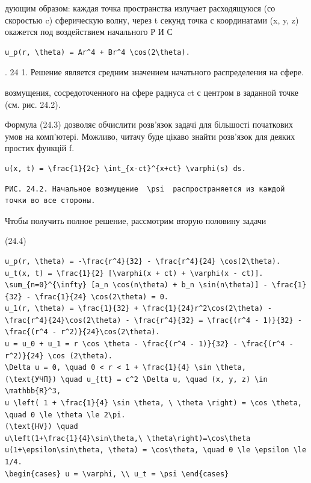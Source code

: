 \documentclass[
  ukrainian,
]{article}
\begin{document}
дующим образом: каждая точка пространства излучает расходящуюся (со
скоростью c) сферическую волну, через t секунд точка с координатами (x,
y, z) окажется под воздействием начального Р И С

\begin{verbatim}
u_p(r, \theta) = Ar^4 + Br^4 \cos(2\theta).
\end{verbatim}

. 24 1. Решение является средним значением начатьного распределения на
сфере.

возмущения, сосредоточенного на сфере раднуса ct с центром в заданной
точке (см. рис. 24.2).

Формула (24.3) дозволяє обчислити розв'язок задачі для більшості
початкових умов на комп'ютері. Можливо, читачу буде цікаво знайти
розв'язок для деяких простих функцій f.

\begin{verbatim}
u(x, t) = \frac{1}{2c} \int_{x-ct}^{x+ct} \varphi(s) ds.
\end{verbatim}

\begin{verbatim}
РИС. 24.2. Начальное возмущение  \psi  распространяется из каждой точки во все стороны.
\end{verbatim}

Чтобы получить полное решение, рассмотрим вторую половину задачи

(24.4)

\begin{verbatim}
u_p(r, \theta) = -\frac{r^4}{32} - \frac{r^4}{24} \cos(2\theta).
u_t(x, t) = \frac{1}{2} [\varphi(x + ct) + \varphi(x - ct)].
\sum_{n=0}^{\infty} [a_n \cos(n\theta) + b_n \sin(n\theta)] - \frac{1}{32} - \frac{1}{24} \cos(2\theta) = 0.
u_1(r, \theta) = \frac{1}{32} + \frac{1}{24}r^2\cos(2\theta) - \frac{r^4}{24}\cos(2\theta) - \frac{r^4}{32} = \frac{(r^4 - 1)}{32} - \frac{(r^4 - r^2)}{24}\cos(2\theta).
u = u_0 + u_1 = r \cos \theta - \frac{(r^4 - 1)}{32} - \frac{(r^4 - r^2)}{24} \cos (2\theta).
\Delta u = 0, \quad 0 < r < 1 + \frac{1}{4} \sin \theta,
(\text{УЧП}) \quad u_{tt} = c^2 \Delta u, \quad (x, y, z) \in \mathbb{R}^3,
u \left( 1 + \frac{1}{4} \sin \theta, \ \theta \right) = \cos \theta, \quad 0 \le \theta \le 2\pi.
(\text{HV}) \quad
u\left(1+\frac{1}{4}\sin\theta,\ \theta\right)=\cos\theta
u(1+\epsilon\sin\theta, \theta) = \cos\theta, \quad 0 \le \epsilon \le 1/4.
\begin{cases} u = \varphi, \\ u_t = \psi \end{cases}
\end{verbatim}
\end{document}
